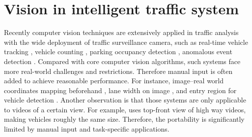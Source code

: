 \section{Vision in intelligent traffic system}
Recently computer vision techniques are extensively applied in traffic analysis with the wide deployment of traffic surveillance camera, such as real-time vehicle tracking \cite{coifman1998real}, vehicle counting \cite{wang2015real}, 
parking occupancy detection \cite{bulan2013video}, anomalous event detection \cite{jiang2011anomalous}. %
Compared with core computer vision algorithms, such systems face more real-world challenges and restrictions. Therefore manual input is often added to achieve reasonable performance. For instance,  image--real world coordinates mapping beforehand \cite{coifman1998real}, lane width on image \cite{chen2011real}, and entry region for vehicle detection \cite{chen2011real}. %
Another observation is that those systems are only applicable to videos of a certain view.  
For example, \cite{coifman1998real}
uses top-front view of high way videos, making vehicles roughly the same size. 
Therefore, the portability is significantly limited by manual input and task-specific applications.

